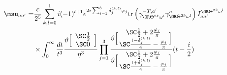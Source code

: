 \begin{equation}
\begin{aligned}
\msu_{aa'}=& \frac{c}{2^5}\sum_{k,l=0}^1
 i (-1)^{l+1}e^{2 i\sum_{j=1}^3 \delta^{(k,l)}_j \varphi_j}
\text{tr}\left(\gamma_{\OR\Theta^{2k}\omega^l}^{-T,a'}\gamma_{\OR\Theta^{2k}\omega^l}^{a}\right)
I^{\OR\Theta^{2k}\omega^l}_{aa'}  \\
& \times 
\int_0^{\infty}\frac{dt}{t^3}
\frac{\vartheta \Bigl[ \begin{array}{c} \SC \frac{1}{2} \\ \SC 0 \end{array} \Bigr]}{\eta^3}
\prod_{j=1}^3 
\frac{\vartheta \Bigl[\!\! \begin{array}{c}  \SC \frac{1}{2}+2\frac{\varphi_j}{\pi} \\ \SC \frac{1-\delta^{(k,l)}_j}{4}-\frac{\varphi_j}{\pi}    
\end{array} \!\!\Bigr]}
  {\vartheta \Bigl[\!\! \begin{array}{c}  \SC \frac{1}{2}+2\frac{\varphi_j}{\pi} \\  \SC \frac{1+\delta^{(k,l)}_j}{4}-\frac{\varphi_j}{\pi}
 \end{array} \!\!\Bigr]}
(t-\frac{i}{2})  \nonumber
\end{aligned}
\end{equation}

